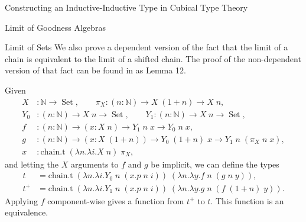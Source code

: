 \documentclass[runningheads]{llncs}
\newcommand{\erase}[1]{{}}
\DeclareMathOperator{\USet}{Set}
\DeclareMathOperator{\Ix}{Ix}
\newcommand{\N}{\mathbb{N}}
\newcommand{\bbO}{\mathbb{O}}
\newcommand{\join}{\texttt{join}}
\newcommand{\inj}{\texttt{inj}}
\begin{document}
\begin{section}{Constructing an Inductive-Inductive Type in Cubical Type Theory}
\begin{subsection}{Limit of Goodness Algebras}
\begin{subsubsection}{Limit of Sets}
    We also prove a dependent version of the fact that the limit of a chain is equivalent to the limit of a shifted chain. The proof of the non-dependent version of that fact can be found in \citet{nonwellfoundedtrees} as Lemma 12.
    
    \begin{lemma}
        Given \begin{align*}
        X &: \N \to \USet,\qquad
        \pi_X : (n : \N) \to X\;(1+n) \to X\;n,\\
        Y_0 &: (n : \N) \to X\;n \to \USet,\qquad
        Y_1 : (n : \N) \to X\;n \to \USet,\\
        f &: (n : \N) \to (x : X\;n) \to Y_1\;n\;x \to Y_0\;n\;x,\\
        g &: (n : \N) \to (x : X\;(1+n)) \to Y_0\;(1+n)\;x \to Y_1\;n\;(\pi_X\;n\;x),\\
        x &: \text{chain.t}\;(\lambda n.\lambda i.X\;n)\;\pi_X,
        \end{align*}
        and letting the $X$ arguments to $f$ and $g$ be implicit,
        we can define the types \begin{align*}t &= \text{chain.t}\;(\lambda n.\lambda i.Y_0\;n\;(x.p\;n\;i))\;(\lambda n.\lambda y.f\;n\;(g\;n\;y)),\\t^+ &= \text{chain.t}\;(\lambda n.\lambda i.Y_1\;n\;(x.p\;n\;i))\;(\lambda n.\lambda y.g\;n\;(f\;(1+n)\;y)).\end{align*}
        Applying $f$ component-wise gives a function from $t^+$ to $t$.
        This function is an equivalence.
    \end{lemma}
    
\end{subsubsection}


\erase{
We will proceed clause by clause, through $(L.A, L.B, L.\eta, L.\join, L.\inj)$.

\begin{subsubsection}{Defining $L.A$}
First, we define \[\Ix_\simeq.A : \Ix A\; L \simeq \text{chain.t}\;(\lambda n.\lambda i.\Ix A\;(S^n\;\bbO))\;(\lambda n.(\delta^\pi\;(S^n\;\bbO)).A)\] witnessing that $\Ix A$ commutes with chains by using Lemma \ref{limit-const-commute} with $\top$, since $\Ix A\;\delta^G = \top$ independent of $\delta^G$, and $(\delta^\pi\;(S^n\;\bbO)).A$ is the identity function.


\end{subsubsection}}
\end{subsection}
\end{section}
\end{document}
